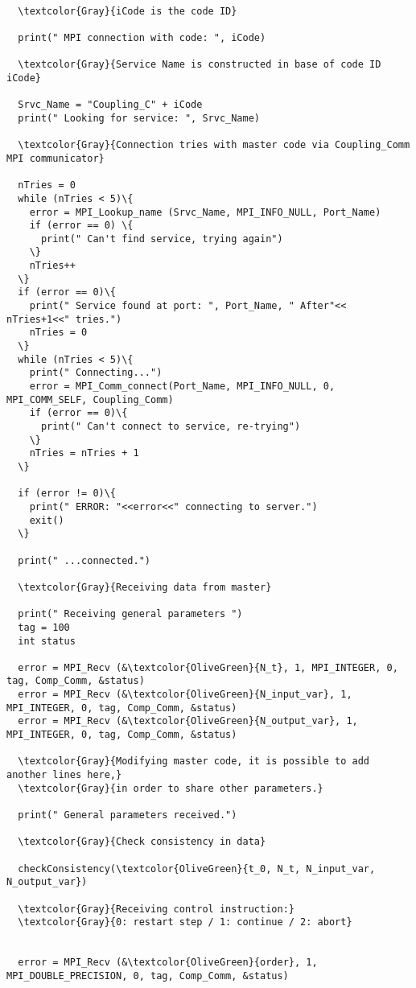 \begin{Verbatim}[frame=single,commandchars=\\\{\}]

  \textcolor{Gray}{iCode is the code ID}
  
  print(" MPI connection with code: ", iCode)

  \textcolor{Gray}{Service Name is constructed in base of code ID iCode}
  
  Srvc_Name = "Coupling_C" + iCode
  print(" Looking for service: ", Srvc_Name)

  \textcolor{Gray}{Connection tries with master code via Coupling_Comm MPI communicator}
  
  nTries = 0
  while (nTries < 5)\{
    error = MPI_Lookup_name (Srvc_Name, MPI_INFO_NULL, Port_Name)
    if (error == 0) \{
      print(" Can't find service, trying again")
    \}
    nTries++
  \}
  if (error == 0)\{
    print(" Service found at port: ", Port_Name, " After"<< nTries+1<<" tries.")
    nTries = 0
  \}
  while (nTries < 5)\{
    print(" Connecting...")
    error = MPI_Comm_connect(Port_Name, MPI_INFO_NULL, 0, MPI_COMM_SELF, Coupling_Comm)
    if (error == 0)\{
      print(" Can't connect to service, re-trying")
    \}
    nTries = nTries + 1
  \}

  if (error != 0)\{
    print(" ERROR: "<<error<<" connecting to server.")
    exit()
  \}

  print(" ...connected.")

  \textcolor{Gray}{Receiving data from master}

  print(" Receiving general parameters ")  
  tag = 100
  int status
  
  error = MPI_Recv (&\textcolor{OliveGreen}{N_t}, 1, MPI_INTEGER, 0, tag, Comp_Comm, &status)
  error = MPI_Recv (&\textcolor{OliveGreen}{N_input_var}, 1, MPI_INTEGER, 0, tag, Comp_Comm, &status)
  error = MPI_Recv (&\textcolor{OliveGreen}{N_output_var}, 1, MPI_INTEGER, 0, tag, Comp_Comm, &status)

  \textcolor{Gray}{Modifying master code, it is possible to add another lines here,}
  \textcolor{Gray}{in order to share other parameters.}    
    
  print(" General parameters received.")

  \textcolor{Gray}{Check consistency in data}

  checkConsistency(\textcolor{OliveGreen}{t_0, N_t, N_input_var, N_output_var})
  
  \textcolor{Gray}{Receiving control instruction:}
  \textcolor{Gray}{0: restart step / 1: continue / 2: abort}


  error = MPI_Recv (&\textcolor{OliveGreen}{order}, 1, MPI_DOUBLE_PRECISION, 0, tag, Comp_Comm, &status)

\end{Verbatim}


